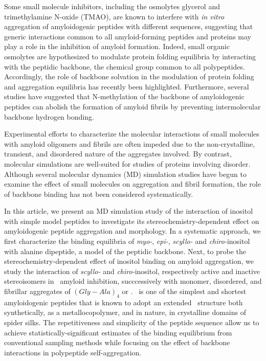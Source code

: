 Some small molecule inhibitors, including the osmolytes glycerol and trimethylamine N-oxide (TMAO), are known to interfere with \textit{in vitro} aggregation of amyloidogenic peptides with different sequences,\cite{Scaramozzino:2006p69,Yang:1999p77,McLaurin:2000p76,Ehrnhoefer:2008p8,Dasilva:2010p25,Bieschke:2010p32} suggesting that generic interactions common to all amyloid-forming peptides and proteins may play a role in the inhibition of amyloid formation. Indeed, small organic osmolytes are hypothesized to modulate protein folding equilibria by interacting with the peptidic backbone, the chemical group common to all polypeptides.\cite{Street:2006p21,Hu:2010p46,Auton:2008p28} Accordingly, the role of backbone solvation in the modulation of protein folding\cite{Rose:2006p35,Auton:2008p28} and aggregation equilibria has recently been highlighted.\cite{Rauscher:2006p43} Furthermore, several studies have suggested that N-methylation of the backbone of amyloidogenic peptides can abolish the formation of amyloid fibrils by preventing intermolecular backbone hydrogen bonding.\cite{Takeda:2010p52,Soto:2007p171}

Experimental efforts to characterize the molecular interactions of small molecules with amyloid oligomers and fibrils are often impeded due to the non-crystalline, transient, and disordered nature of the aggregates involved. By contrast, molecular simulations are well-suited for studies of proteins involving disorder.\cite{Rauscher:2010p88} Although several molecular dynamics (MD) simulation studies have begun to examine the effect of small molecules on aggregation and fibril formation,\cite{Takeda:2010p34,Raman:2009p47,Lemkul:2010p23,Liu:2009p18} the role of backbone binding has not been considered systematically.

In this article, we present an MD simulation study of the interaction of inositol with simple model peptides to investigate its stereochemistry-dependent effect on amyloidogenic peptide aggregation and morphology. In a systematic approach, we first characterize the binding equilibria of \textit{myo-}, \textit{epi-}, \textit{scyllo-} and \textit{chiro-}inositol with alanine dipeptide, a model of the peptidic backbone. Next, to probe the stereochemistry-dependent effect of inositol binding on amyloid aggregation, we study the interaction of \textit{scyllo-} and \textit{chiro-}inositol, respectively active and inactive stereoisomers in \abeta\ amyloid inhibition, succcessively with monomer, disordered, and fibrillar aggregates of $(Gly-Ala)_4$ or \gafour. \gafour\ is one of the simplest and shortest amyloidogenic peptides that is known to adopt an extended \bsheet\ structure both synthetically,\cite{Rathore:2001p37} as a metallocopolymer,\cite{Vandermeulen:2006p15} and in nature, in crystalline domains of spider silks.\cite{Kenney:2002p45,Fossey:1991fk} The repetitiveness and simplicity of the peptide sequence allow us to achieve statistically-significant estimates of the binding equilibrium from conventional sampling methods while focusing on the effect of backbone interactions in polypeptide self-aggregation. 

